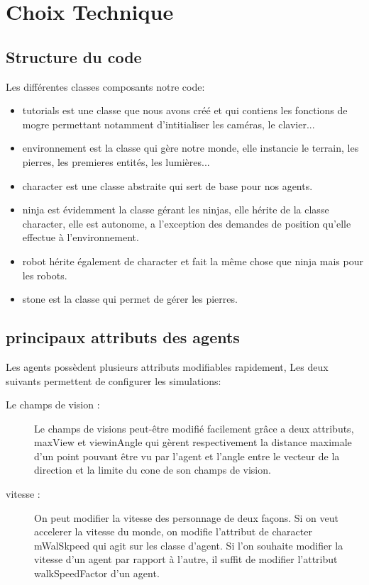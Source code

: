 \section{Choix Technique}
\thispagestyle{fancy}

\subsection{Structure du code}
Les différentes classes composants notre code:
\begin{itemize}
\item tutorials est une classe que nous avons créé et qui contiens les
  fonctions de mogre permettant notamment d'intitialiser les caméras,
  le clavier...
\item environnement est la classe qui gère notre monde, elle instancie
  le terrain, les pierres, les premieres entités, les lumières...
\item character est une classe abstraite qui sert de base pour nos
  agents.
\item ninja est évidemment la classe gérant les ninjas, elle hérite de
  la classe character, elle est autonome, a l'exception des demandes
  de position qu'elle effectue à l'environnement.
\item robot hérite également de character et fait la même chose que ninja mais pour les robots.
\item stone est la classe qui permet de gérer les pierres. 
\end{itemize}

\subsection{principaux attributs des agents}

Les agents possèdent plusieurs attributs modifiables rapidement, Les
deux suivants permettent de configurer les simulations:

\begin{description}
\item[Le champs de vision :] Le champs de visions peut-être modifié
  facilement grâce a deux attributs, maxView et viewinAngle qui gèrent
  respectivement la distance maximale d'un point pouvant être vu par
  l'agent et l'angle entre le vecteur de la direction et la limite du
  cone de son champs de vision.
\item[vitesse :] On peut modifier la vitesse des personnage de deux
  façons. Si on veut accelerer la vitesse du monde, on modifie
  l'attribut de character mWalSkpeed qui agit sur les classe
  d'agent. Si l'on souhaite modifier la vitesse d'un agent par rapport
  à l'autre, il suffit de modifier l'attribut walkSpeedFactor d'un
  agent.
\end{description}

